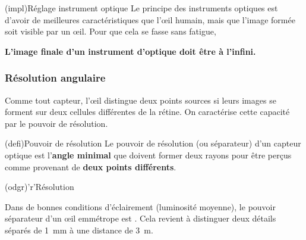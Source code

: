 \documentclass[../../main/main.tex]{subfiles}
\begin{document}
\begin{tcb}[label=impl:instrument_opt](impl){Réglage instrument optique}
	Le principe des instruments optiques est d'avoir de meilleures
	caractéristiques que l'œil humain, mais que l'image formée soit visible par
	un œil. Pour que cela se fasse sans fatigue,
	\begin{center}
		\bfseries L'image finale d'un instrument d'optique doit être à l'infini.
	\end{center}
\end{tcb}

\subsubsection{Résolution angulaire}
Comme tout capteur, l'œil distingue deux points sources si leurs images se
forment sur deux cellules différentes de la rétine. On caractérise cette
capacité par le pouvoir de résolution.
\begin{tcbraster}[raster columns=2, raster equal height=rows]
	\begin{tcb}[label=def:resolu](defi){Pouvoir de résolution}
		Le pouvoir de résolution (ou séparateur) d'un capteur optique est
		l'\textbf{angle minimal} que doivent former deux rayons pour être perçus
		comme provenant de \textbf{deux points différents}.
	\end{tcb}
	\begin{tcb}[label=odgr:resolu](odgr)'r'{Résolution}

		Dans de bonnes conditions d'éclairement (luminosité moyenne), le pouvoir
		séparateur d'un œil emmétrope est . Cela revient à distinguer deux détails séparés de
		\SI{1}{mm} à une distance de \SI{3}{m}.
	\end{tcb}
\end{tcbraster}
\end{document}
